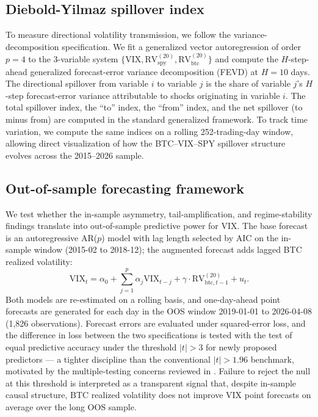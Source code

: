 \documentclass[11pt,a4paper]{article}
\begin{document}
\subsection{Diebold-Yilmaz spillover index}
\label{subsec:dy}

To measure directional volatility transmission, we follow the \citet{diebold2012} variance-decomposition specification. We fit a generalized vector autoregression of order $p = 4$ to the 3-variable system $\{\text{VIX}, \text{RV}^{(20)}_{\text{spy}}, \text{RV}^{(20)}_{\text{btc}}\}$ and compute the $H$-step-ahead generalized forecast-error variance decomposition (FEVD) at $H = 10$ days. The directional spillover from variable $i$ to variable $j$ is the share of variable $j$'s $H$-step forecast-error variance attributable to shocks originating in variable $i$. The total spillover index, the ``to'' index, the ``from'' index, and the net spillover (to minus from) are computed in the standard generalized framework. To track time variation, we compute the same indices on a rolling 252-trading-day window, allowing direct visualization of how the BTC--VIX--SPY spillover structure evolves across the 2015--2026 sample.

\subsection{Out-of-sample forecasting framework}
\label{subsec:dm}

We test whether the in-sample asymmetry, tail-amplification, and regime-stability findings translate into out-of-sample predictive power for VIX. The base forecast is an autoregressive AR($p$) model with lag length selected by AIC on the in-sample window (2015-02 to 2018-12); the augmented forecast adds lagged BTC realized volatility:
\begin{equation}
\text{VIX}_t = \alpha_0 + \sum_{j=1}^{p} \alpha_j \text{VIX}_{t-j} + \gamma \cdot \text{RV}^{(20)}_{\text{btc}, t-1} + u_t.
\label{eq:oos_aug}
\end{equation}
Both models are re-estimated on a rolling basis, and one-day-ahead point forecasts are generated for each day in the OOS window 2019-01-01 to 2026-04-08 (1{,}826 observations). Forecast errors are evaluated under squared-error loss, and the difference in loss between the two specifications is tested with the \citet{diebold1995} test of equal predictive accuracy under the \citet{harvey2016} threshold $|t| > 3$ for newly proposed predictors --- a tighter discipline than the conventional $|t| > 1.96$ benchmark, motivated by the multiple-testing concerns reviewed in \citet{conrad2020}. Failure to reject the null at this threshold is interpreted as a transparent signal that, despite in-sample causal structure, BTC realized volatility does not improve VIX point forecasts on average over the long OOS sample.
\end{document}
